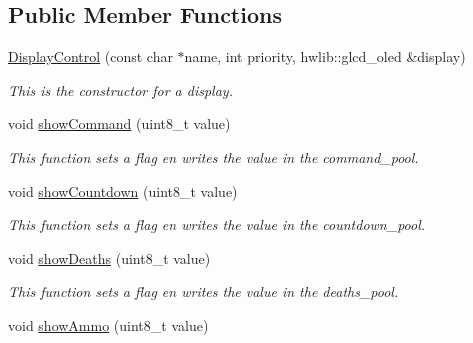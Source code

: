 \subsection*{Public Member Functions}
\begin{DoxyCompactItemize}
\item 
\mbox{\hyperlink{class_display_control_a5a24ccc28d6984bda6871ef6d0e4af3f}{Display\+Control}} (const char $\ast$name, int priority, hwlib\+::glcd\+\_\+oled \&display)
\begin{DoxyCompactList}\small\item\em This is the constructor for a display. \end{DoxyCompactList}\item 
\mbox{\label{class_display_control_a78b3ace358fc199a76e00148115f449d}} 
void \mbox{\hyperlink{class_display_control_a78b3ace358fc199a76e00148115f449d}{show\+Command}} (uint8\+\_\+t value)
\begin{DoxyCompactList}\small\item\em This function sets a flag en writes the value in the command\+\_\+pool. \end{DoxyCompactList}\item 
\mbox{\label{class_display_control_adcdd7237b9510e9cb9b2aff9d695ad2e}} 
void \mbox{\hyperlink{class_display_control_adcdd7237b9510e9cb9b2aff9d695ad2e}{show\+Countdown}} (uint8\+\_\+t value)
\begin{DoxyCompactList}\small\item\em This function sets a flag en writes the value in the countdown\+\_\+pool. \end{DoxyCompactList}\item 
\mbox{\label{class_display_control_aee4d1de8dc9b2aab72685cef2ce42d92}} 
void \mbox{\hyperlink{class_display_control_aee4d1de8dc9b2aab72685cef2ce42d92}{show\+Deaths}} (uint8\+\_\+t value)
\begin{DoxyCompactList}\small\item\em This function sets a flag en writes the value in the deaths\+\_\+pool. \end{DoxyCompactList}\item 
\mbox{\label{class_display_control_a6b4ed1ee72406c1ab082b7c6cf900001}} 
void \mbox{\hyperlink{class_display_control_a6b4ed1ee72406c1ab082b7c6cf900001}{show\+Ammo}} (uint8\+\_\+t value)

\end{DoxyCompactItemize}
